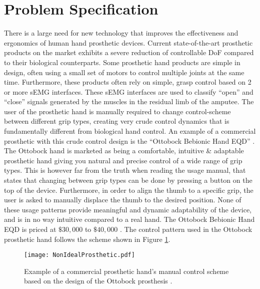 \documentclass[../main.tex]{subfiles}
\begin{document}
\section{Problem Specification}

There is a large need for new technology that improves the effectiveness and ergonomics of human hand prosthetic devices.
Current state-of-the-art prosthetic products on the market exhibits a severe reduction of controllable \gls{DoF} compared to their biological counterparts.
Some prosthetic hand products are simple in design, often using a small set of motors to control multiple joints at the same time.
Furthermore, these products often rely on simple, grasp control based on 2 or more \gls{sEMG} interfaces.
These \gls{sEMG} interfaces are used to classify ``open'' and ``close'' signals generated by the muscles in the residual limb of the amputee.
The user of the prosthetic hand is manually required to change control-scheme between different grip types, creating very crude control dynamics that is fundamentally different from biological hand control.
An example of a commercial prosthetic with this crude control design is the ``Ottobock Bebionic Hand EQD'' \cite{ottobock}.
The Ottobock hand is marketed as being a comfortable, intuitive \& adaptable prosthetic hand giving you natural and precise control of a wide range of grip types.
This is however far from the truth when reading the usage manual, that states that changing between grip types can be done by pressing a button on the top of the device.
Furthermore, in order to align the thumb to a specific grip, the user is asked to manually displace the thumb to the desired position.
None of these usage patterns provide meaningful and dynamic adaptability of the device, and is in no way intuitive compared to a real hand.
The Ottobock Bebionic Hand EQD is priced at $\$30,000$ to $\$40,000$ \cite{ottobock-prices}.
The control pattern used in the Ottobock prosthetic hand follows the scheme shown in Figure \ref{fig:nonidealprosthetic}.

\begin{figure}[H]
\begin{center}
\texttt{[image: NonIdealProsthetic.pdf]}
\caption{Example of a commercial prosthetic hand's manual control scheme based on the design of the Ottobock prosthesis \cite{ottobock}.}
\label{fig:nonidealprosthetic}
\end{center}
\end{figure}
\end{document}
